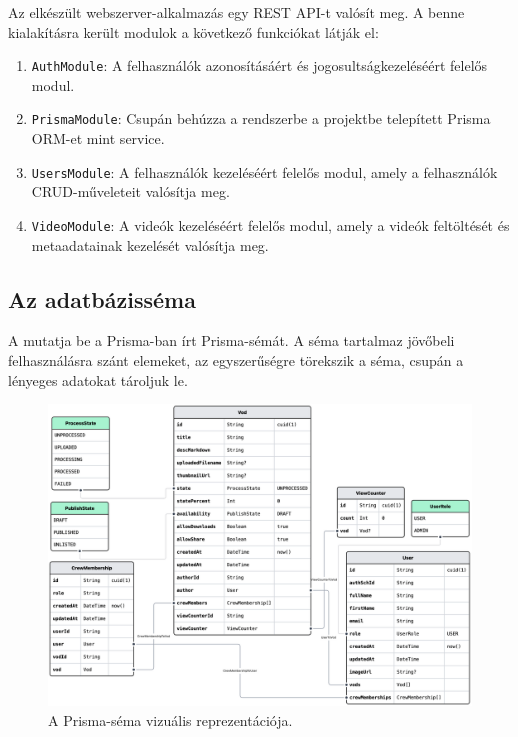 Az elkészült webszerver-alkalmazás egy REST API-t valósít meg. A benne kialakításra került modulok a következő funkciókat látják el:

\begin{enumerate}
  \item \verb|AuthModule|: A felhasználók azonosításáért és jogosultságkezeléséért felelős modul.
  \item \verb|PrismaModule|: Csupán behúzza a rendszerbe a projektbe telepített Prisma ORM-et mint service.
  \item \verb|UsersModule|: A felhasználók kezeléséért felelős modul, amely a felhasználók CRUD-műveleteit valósítja meg.
  \item \verb|VideoModule|: A videók kezeléséért felelős modul, amely a videók feltöltését és metaadatainak kezelését valósítja meg.
\end{enumerate}

\subsection{Az adatbázisséma}

A  mutatja be a Prisma-ban írt Prisma-sémát. A séma tartalmaz jövőbeli felhasználásra szánt elemeket, az egyszerűségre törekszik a séma, csupán a lényeges adatokat tároljuk le.

\begin{figure}[ht!]
  \centering
  \includegraphics[width=155mm, keepaspectratio]{figures/prismaliser.png}
  \caption{A Prisma-séma vizuális reprezentációja.}
  \label{fig:prismaliser}
\end{figure}


